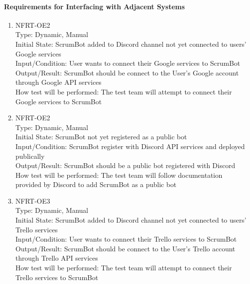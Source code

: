 \documentclass[12pt, titlepage]{article}
\begin{document}
\paragraph{Requirements for Interfacing with Adjacent Systems}
\begin{enumerate}

\item{NFRT-OE2}\\
Type: Dynamic, Manual\\
Initial State: ScrumBot added to Discord channel not yet connected to users' Google services\\
Input/Condition: User wants to connect their Google services to ScrumBot\\
Output/Result: ScrumBot should be connect to the User's Google account through Google API services\\
How test will be performed: The test team will attempt to connect their Google services to ScrumBot

\item{NFRT-OE2}\\
Type: Dynamic, Manual\\
Initial State: ScrumBot not yet registered as a public bot\\
Input/Condition: ScrumBot register with Discord API services and deployed publically\\
Output/Result: ScrumBot should be a public bot registered with Discord\\
How test will be performed: The test team will follow documentation provided by Discord to add ScrumBot as a public bot

\item{NFRT-OE3}\\
Type: Dynamic, Manual\\
Initial State: ScrumBot added to Discord channel not yet connected to users' Trello services\\
Input/Condition: User wants to connect their Trello services to ScrumBot\\
Output/Result: ScrumBot should be connect to the User's Trello account through Trello API services\\
How test will be performed: The test team will attempt to connect their Trello services to ScrumBot
\end{enumerate}
\end{document}
